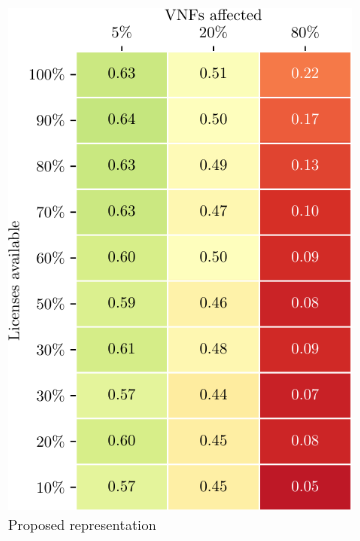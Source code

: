 \begin{figure}[t!]
    \centering
    \begin{subfigure}[b]{0.48\linewidth}
        \includegraphics[width=\textwidth]{graphs/constraints/ca_NSGAII_LIM-crop}
        \caption{Proposed representation}
    \end{subfigure}
    \vspace{1em}
    \begin{subfigure}[b]{0.3732\linewidth}

\end{subfigure}
\end{figure}
